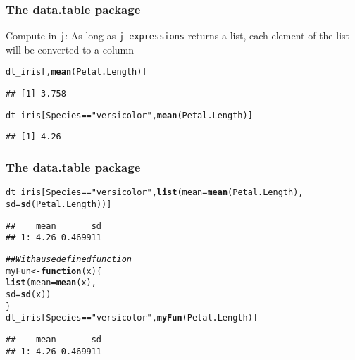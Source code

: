 \documentclass[paper=screen,mathserif]{beamer}\usepackage[]{graphicx}\usepackage[]{color}
\makeatletter
\newcommand{\hlstr}[1]{\textcolor[rgb]{0.192,0.494,0.8}{#1}}%
\newcommand{\hlcom}[1]{\textcolor[rgb]{0.678,0.584,0.686}{\textit{#1}}}%
\newcommand{\hlopt}[1]{\textcolor[rgb]{0,0,0}{#1}}%
\newcommand{\hlstd}[1]{\textcolor[rgb]{0.345,0.345,0.345}{#1}}%
\newcommand{\hlkwa}[1]{\textcolor[rgb]{0.161,0.373,0.58}{\textbf{#1}}}%
\newcommand{\hlkwb}[1]{\textcolor[rgb]{0.69,0.353,0.396}{#1}}%
\newcommand{\hlkwc}[1]{\textcolor[rgb]{0.333,0.667,0.333}{#1}}%
\newcommand{\hlkwd}[1]{\textcolor[rgb]{0.737,0.353,0.396}{\textbf{#1}}}%
\newenvironment{kframe}{%
 \def\at@end@of@kframe{}%
 \ifinner\ifhmode%
  \def\at@end@of@kframe{\end{minipage}}%
  \begin{minipage}{\columnwidth}%
 \fi\fi%
 \def\FrameCommand##1{\hskip\@totalleftmargin \hskip-\fboxsep
 \colorbox{shadecolor}{##1}\hskip-\fboxsep
     \hskip-\linewidth \hskip-\@totalleftmargin \hskip\columnwidth}%
 \MakeFramed {\advance\hsize-\width
   \@totalleftmargin\z@ \linewidth\hsize
   \@setminipage}}%
 {\par\unskip\endMakeFramed%
 \at@end@of@kframe}
\newenvironment{knitrout}{}{} %
\newcommand{\ft}[1]{\frametitle{#1}}
\makeatother
\begin{document}
\begin{frame}[fragile]
  \ft{The {\bf data.table} package}
  
  Compute in {\tt j}: As long as {\tt j-expressions} returns a list,
  each element of the list will be converted to a column
  
\begin{knitrout}\scriptsize
{}\color{fgcolor}\begin{kframe}
\begin{alltt}
\hlstd{dt_iris[,} \hlkwd{mean}\hlstd{(Petal.Length)]}
\end{alltt}
\begin{verbatim}
## [1] 3.758
\end{verbatim}
\begin{alltt}
\hlstd{dt_iris[Species} \hlopt{==} \hlstr{"versicolor"}\hlstd{,} \hlkwd{mean}\hlstd{(Petal.Length)]}
\end{alltt}
\begin{verbatim}
## [1] 4.26
\end{verbatim}
\end{kframe}
\end{knitrout}
\end{frame}

\begin{frame}[fragile]
  \ft{The {\bf data.table} package}

\begin{knitrout}\scriptsize
{}\color{fgcolor}\begin{kframe}
\begin{alltt}
\hlstd{dt_iris[Species} \hlopt{==} \hlstr{"versicolor"}\hlstd{,} \hlkwd{list}\hlstd{(}\hlkwc{mean} \hlstd{=} \hlkwd{mean}\hlstd{(Petal.Length),}
        \hlkwc{sd} \hlstd{=} \hlkwd{sd}\hlstd{(Petal.Length))]}
\end{alltt}
\begin{verbatim}
##    mean       sd
## 1: 4.26 0.469911
\end{verbatim}
\begin{alltt}
\hlcom{## With a use defined function}
\hlstd{myFun} \hlkwb{<-} \hlkwa{function}\hlstd{(}\hlkwc{x}\hlstd{) \{}
    \hlkwd{list}\hlstd{(}\hlkwc{mean} \hlstd{=} \hlkwd{mean}\hlstd{(x),}
         \hlkwc{sd} \hlstd{=} \hlkwd{sd}\hlstd{(x))}
\hlstd{\}}
\hlstd{dt_iris[Species} \hlopt{==} \hlstr{"versicolor"}\hlstd{,} \hlkwd{myFun}\hlstd{(Petal.Length)]}
\end{alltt}
\begin{verbatim}
##    mean       sd
## 1: 4.26 0.469911
\end{verbatim}
\end{kframe}
\end{knitrout}

\end{frame}
\end{document}
